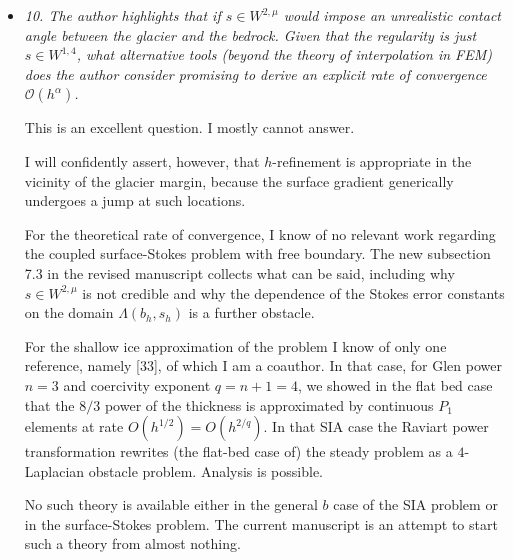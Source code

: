 \documentclass[11pt,reqno]{amsart}
\newcommand{\reply}[2]{%
\medskip
\item \emph{#1}

\medskip
\noindent #2
}
\begin{document}
\begin{itemize}[itemindent=0mm, labelsep=5mm]
\reply{10. The author highlights that if $s\in W^{2,\mu}$ would impose an unrealistic contact angle between the glacier and the bedrock. Given that the regularity is just $s \in W^{1,4}$, what alternative tools (beyond the theory of interpolation in FEM) does the author consider promising to derive an explicit rate of convergence $\mathcal{O}(h^\alpha)$.}
{This is an excellent question.  I mostly cannot answer. \par
I will confidently assert, however, that $h$-refinement is appropriate in the vicinity of the glacier margin, because the surface gradient generically undergoes a jump at such locations. \par
For the theoretical rate of convergence, I know of no relevant work regarding the coupled surface-Stokes problem with free boundary.  The new subsection 7.3 in the revised manuscript collects what can be said, including why $s\in W^{2,\mu}$ is not credible and why the dependence of the Stokes error constants on the domain $\Lambda(b_h,s_h)$ is a further obstacle. \par
For the shallow ice approximation of the problem I know of only one reference, namely [33], of which I am a coauthor.  In that case, for Glen power $n=3$ and coercivity exponent $q=n+1=4$, we showed in the flat bed case that the $8/3$ power of the thickness is approximated by continuous $P_1$ elements at rate $O(h^{1/2})=O(h^{2/q})$.  In that SIA case the Raviart power transformation rewrites (the flat-bed case of) the steady problem as a $4$-Laplacian obstacle problem.  Analysis is possible. \par
No such theory is available either in the general $b$ case of the SIA problem or in the surface-Stokes problem.  The current manuscript is an attempt to start such a theory from almost nothing.}


\end{itemize}
\end{document}
